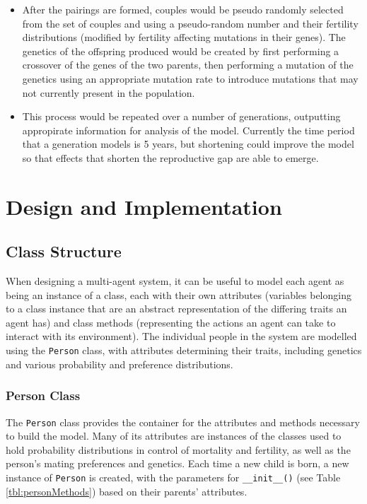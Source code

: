 \documentclass[authoryearcitations]{UoYCSproject}
\begin{document}
\begin{itemize}
\item After the pairings are formed, couples would be pseudo randomly selected from the set of couples and using a pseudo-random number and their fertility distributions (modified by fertility affecting mutations in their genes). The genetics of the offspring produced would be created by first performing a crossover of the genes of the two parents, then performing a mutation of the genetics using an appropriate mutation rate to introduce mutations that may not currently present in the population.

\item This process would be repeated over a number of generations, outputting appropirate information for analysis of the model. Currently the time period that a generation models is 5 years, but shortening could improve the model so that effects that shorten the reproductive gap are able to emerge.

\end{itemize}

\chapter{Design and Implementation}
\label{cha:Design and Implementation}

\section{Class Structure}
When designing a multi-agent system, it can be useful to model each agent as being an instance of a class, each with their own attributes (variables belonging to a class instance that are an abstract representation of the differing traits an agent has) and class methods (representing the actions an agent can take to interact with its environment). The individual people in the system are modelled using the \texttt{Person} class, with attributes determining their traits, including genetics and various probability and preference distributions. 

\subsection{Person Class}
The \texttt{Person} class provides the container for the attributes and methods necessary to build the model. Many of its attributes are instances of the classes used to hold probability distributions in control of mortality and fertility, as well as the person's mating preferences and genetics. Each time a new child is born, a new instance of \texttt{Person} is created, with the parameters for \texttt{\_\_init\_\_()} (see Table \ref{tbl:personMethods}) based on their parents' attributes.
\end{document}
